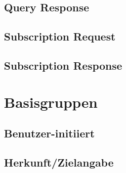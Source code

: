 \subsection*{Query Response}



\subsection*{Subscription Request}



\subsection*{Subscription Response}



\section{Basisgruppen}
\label{sec:Nachrichten:Basisgruppen}

\subsection*{Benutzer-initiiert}





\subsection*{Herkunft/Zielangabe}




